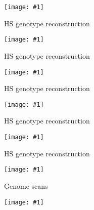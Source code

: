 \documentclass[12pt]{article}
\newcommand{\headsize}{\fontsize{35}{35} \selectfont}
\newcommand{\figh}[2]{\centerline{\texttt{[image: \#1]}}}
\begin{document}
\vspace{5mm}

\figh{Figs/genoprobsA.pdf}{0.9}


\newpage

\headsize \color{myyellow}
\hfill\begin{minipage}{6.75in}
\centering
HS genotype reconstruction
\end{minipage}

\vspace{5mm}

\figh{Figs/genoprobsB.pdf}{0.9}


\newpage

\headsize \color{myyellow}
\hfill\begin{minipage}{6.75in}
\centering
HS genotype reconstruction
\end{minipage}

\vspace{5mm}

\figh{Figs/genoprobsC.pdf}{0.9}


\newpage

\headsize \color{myyellow}
\hfill\begin{minipage}{6.75in}
\centering
HS genotype reconstruction
\end{minipage}

\vspace{5mm}

\figh{Figs/genoprobsD.pdf}{0.9}


\newpage

\headsize \color{myyellow}
\hfill\begin{minipage}{6.75in}
\centering
HS genotype reconstruction
\end{minipage}

\vspace{5mm}

\figh{Figs/genoprobsE.pdf}{0.9}


\newpage

\headsize \color{myyellow}
\hfill\begin{minipage}{6.75in}
\centering
HS genotype reconstruction
\end{minipage}

\vspace{5mm}

\figh{Figs/genoprobsF.pdf}{0.9}


\newpage

\headsize \color{myyellow}
\hfill\begin{minipage}{6.75in}
\centering
Genome scans
\end{minipage}

\vspace{5mm}

\figh{Figs/do_scan.png}{0.9}
\end{document}
